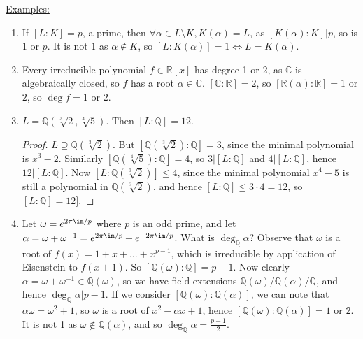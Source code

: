\documentclass[a4paper, 10pt, twocolumn]{amsart}
\begin{document}
\underline{Examples:}
\begin{enumerate}
\item If $[L:K] = p$, a prime, then $\forall \alpha \in L\setminus K, K(\alpha) = L$, as $[K(\alpha) : K]|p$, so is $1$ or $p$. It is not $1$ as $\alpha \notin K$, so $[L:K(\alpha)] = 1 \iff L = K(\alpha)$.
\item Every irreducible polynomial  $f \in \mathbb{R}[x]$ has degree 1 or 2, as $\mathbb{C}$ is algebraically closed, so $f$ has a root $\alpha \in \mathbb{C}$. $[\mathbb{C}:\mathbb{R}] = 2$, so $[\mathbb{R}(\alpha):\mathbb{R}] = 1$ or $2$, so $\deg f = 1$ or $2$.
\item $L = \mathbb{Q}(\sqrt[3]{2},\sqrt[4]{5})$. Then $[L:\mathbb{Q}] = 12$.
\begin{proof}
$L \supseteq \mathbb{Q}(\sqrt[3]{2}).$ But $[\mathbb{Q}(\sqrt[3]{2}):\mathbb{Q}] = 3$, since the minimal polynomial is $x^3-2$. Similarly $[\mathbb{Q}(\sqrt[4]{5}):\mathbb{Q}] = 4$, so $3|[L:\mathbb{Q}]$ and $4|[L:\mathbb{Q}]$, hence $12|[L:\mathbb{Q}]$. Now $[L:\mathbb{Q}(\sqrt[3]{2})] \leq 4$, since the minimal polynomial $x^4-5$ is still a polynomial in $\mathbb{Q}(\sqrt[3]{2})$, and hence $[L:\mathbb{Q}] \leq 3\cdot 4 = 12$, so $[L:\mathbb{Q}] = 12]$.
\end{proof}
\item Let $\omega = e^{2\pi\im/p}$ where $p$ is an odd prime, and let $\alpha =\omega + \omega^{-1} = e^{2\pi\im/p} + e^{-2\pi\im/p}$. What is $\deg_{\mathbb{Q}} \alpha$? Observe that $\omega$ is a root of $f(x)=1+x+\ldots+x^{p-1}$, which is irreducible by application of Eisenstein to $f(x+1)$. So $[\mathbb{Q}(\omega):\mathbb{Q}] = p-1$. Now clearly $\alpha = \omega + \omega^{-1} \in \mathbb{Q}(\omega)$, so we have field extensions $\mathbb{Q}(\omega)/\mathbb{Q}(\alpha)/\mathbb{Q}$, and hence $\deg_{\mathbb{Q}} \alpha|p-1$. If we consider $[\mathbb{Q}(\omega):\mathbb{Q}(\alpha)]$, we can note that $\alpha\omega = \omega^2 + 1$, so $\omega$ is a root of $x^2-\alpha x+1$, hence $[\mathbb{Q}(\omega):\mathbb{Q}(\alpha)] = 1$ or $2$. It is not 1 as $\omega \notin \mathbb{Q}(\alpha)$, and so $\deg_{\mathbb{Q}} \alpha = \frac{p-1}{2}$.
\end{enumerate}
\end{document}
